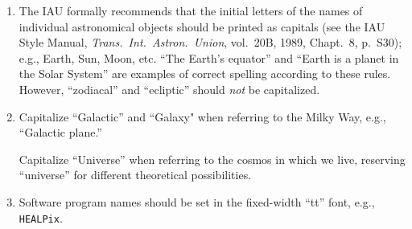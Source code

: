 \documentclass[letterpaper,11pt]{article}
\begin{document}
\begin{enumerate}

\item The IAU formally recommends that the initial letters of the names of
individual astronomical objects should be printed as capitals (see the IAU
Style Manual, {\it Trans.~Int.~Astron.~Union\/}, vol.~20B, 1989, Chapt.~8,
p.~S30); e.g., Earth, Sun, Moon, etc. ``The Earth's equator''
and ``Earth is a planet in the Solar System'' are examples of correct spelling
according to these rules.  However, ``zodiacal'' and ``ecliptic''
should {\it not\/} be capitalized.

\item Capitalize ``Galactic'' and ``Galaxy" when referring to the Milky Way, e.g.,
``Galactic plane.''

Capitalize ``Universe'' when referring to the cosmos in which we live,
reserving ``universe'' for different theoretical possibilities.


\item Software program names should be set in the fixed-width ``tt'' font,
e.g., {\tt HEALPix}. 





\end{enumerate}
\end{document}
